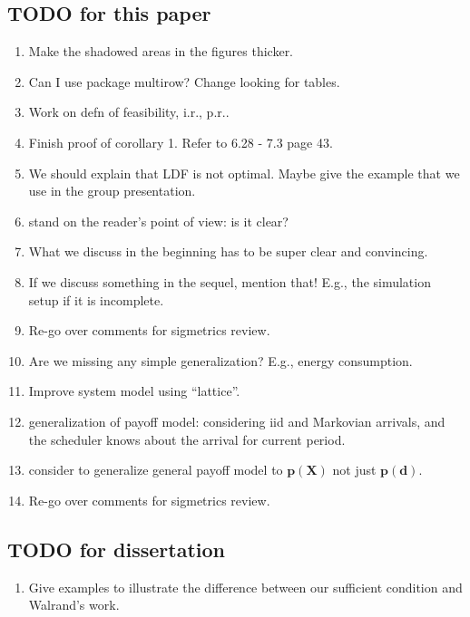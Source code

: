\documentclass[prodmode,acmtompecs]{acmsmall}
\newcommand{\myComments}[1]{}
\newcommand{\commentEnd}{\myComments{End}}
\begin{document}
\subsection{TODO for this paper}
\begin{enumerate}
\item Make the shadowed areas in the figures thicker. 
\item Can I use package multirow? Change looking for tables. 
\item Work on defn of feasibility, i.r., p.r.. 
\item Finish proof of corollary 1. Refer to 6.28 - 7.3 page 43. 
\item We should explain that LDF is not optimal. Maybe give the example that we use in the group presentation. 
\item stand on the reader's point of view: is it clear? 
\item What we discuss in the beginning has to be super clear and convincing. 
\item If we discuss something in the sequel, mention that! E.g., the simulation setup if it is incomplete. 
\item Re-go over comments for sigmetrics review. 
\item Are we missing any simple generalization? E.g., energy consumption. 
\item Improve system model using ``lattice''. 
\item generalization of payoff model: considering iid and Markovian arrivals, and the scheduler knows about the arrival for current period. 
\item consider to generalize general payoff model to $\mathbf{p}(\mathbf{X})$ not just $\mathbf{p}(\mathbf{d})$. 
\item Re-go over comments for sigmetrics review. 
\end{enumerate}

\subsection{TODO for dissertation}
\begin{enumerate}
\item Give examples to illustrate the difference between our sufficient condition and Walrand's work. 
\end{enumerate}
\commentEnd\fi
\end{document}
